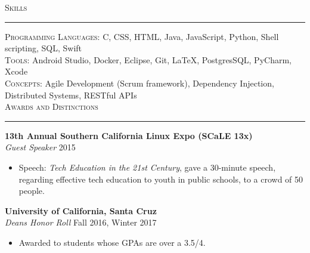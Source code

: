 \documentclass{res}
\begin{document}
\begin{resume}
\textsc{{\Large Skills}}
\vspace{0.5mm}
\hrule width18.5cm
	\textsc{Programming Languages:} C, CSS, HTML, Java, JavaScript, Python, Shell scripting, SQL, Swift\\[2mm]
	\textsc{Tools:} Android Studio, Docker, Eclipse, Git, \LaTeX, PostgresSQL, PyCharm, Xcode\\[2mm]
	\textsc{Concepts:} Agile Development (Scrum framework), Dependency Injection, Distributed Systems, RESTful APIs\\[0.5mm]

\textsc{{\Large Awards and Distinctions}}
\vspace{0.5mm}
\hrule width18.5cm
\textbf{13th Annual Southern California Linux Expo (SCaLE 13x)}\\
\textit{Guest Speaker}
\hfill
2015\\
	\begin{itemize}
		\vspace{-3mm}
		\item Speech: \textit{Tech Education in the 21st Century}, gave a 30-minute speech, regarding effective tech education to youth in public schools, to a crowd of 50 people.
	\end{itemize}
\textbf{University of California, Santa Cruz}\\
\textit{Dean\textquotesingle s Honor Roll}
\hfill
Fall 2016, Winter 2017\\
	\begin{itemize}
		\vspace{-3mm}
		\item Awarded to students whose GPAs are over a 3.5/4.
	\end{itemize}
\vspace{-1mm}

\end{resume}
\end{document}
